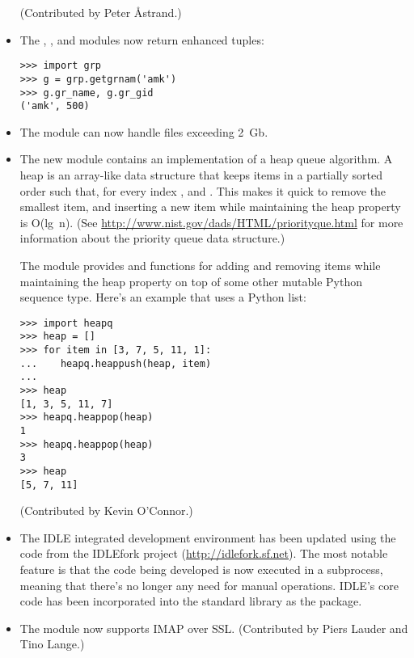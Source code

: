 \documentclass{howto}
\begin{document}
\begin{itemize}
(Contributed by Peter \AA{strand}.)

\item The , , and  modules
now return enhanced tuples:

\begin{verbatim}
>>> import grp
>>> g = grp.getgrnam('amk')
>>> g.gr_name, g.gr_gid
('amk', 500)
\end{verbatim}

\item The  module can now handle files exceeding 2~Gb.  

\item The new  module contains an implementation of a
heap queue algorithm.  A heap is an array-like data structure that
keeps items in a partially sorted order such that, for every index
,  and
.  This makes it quick to
remove the smallest item, and inserting a new item while maintaining
the heap property is O(lg~n).  (See
\url{http://www.nist.gov/dads/HTML/priorityque.html} for more
information about the priority queue data structure.)

The  module provides  and
 functions for adding and removing items while
maintaining the heap property on top of some other mutable Python
sequence type.  Here's an example that uses a Python list:

\begin{verbatim}
>>> import heapq
>>> heap = []
>>> for item in [3, 7, 5, 11, 1]:
...    heapq.heappush(heap, item)
...
>>> heap
[1, 3, 5, 11, 7]
>>> heapq.heappop(heap)
1
>>> heapq.heappop(heap)
3
>>> heap
[5, 7, 11]
\end{verbatim}

(Contributed by Kevin O'Connor.)

\item The IDLE integrated development environment has been updated
using the code from the IDLEfork project
(\url{http://idlefork.sf.net}).  The most notable feature is that the
code being developed is now executed in a subprocess, meaning that
there's no longer any need for manual  operations.
IDLE's core code has been incorporated into the standard library as the
 package.

\item The  module now supports IMAP over SSL.
(Contributed by Piers Lauder and Tino Lange.)


\end{itemize}
\end{document}
